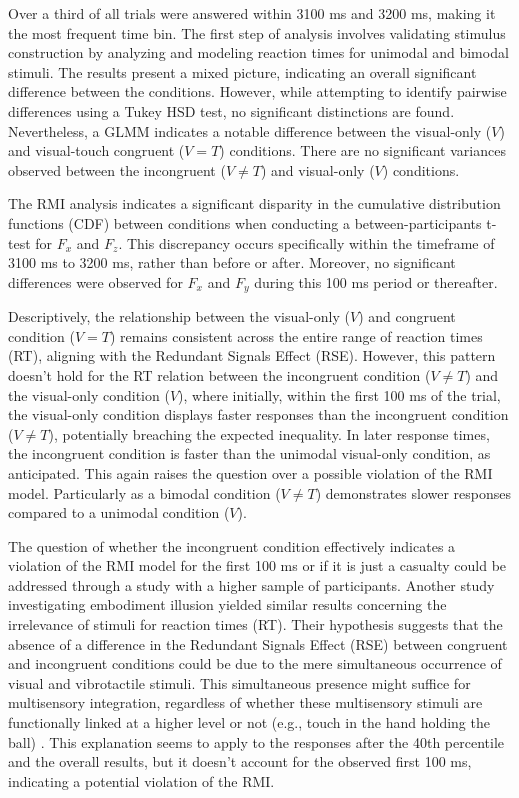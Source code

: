 \documentclass[12pt,oneside,openright]{report}
\begin{document}
Over a third of all trials were answered within 3100 ms and 3200 ms, making it the most frequent time bin. The first step of analysis involves validating stimulus construction by analyzing and modeling reaction times for unimodal and bimodal stimuli. The results present a mixed picture, indicating an overall significant difference between the conditions. However, while attempting to identify pairwise differences using a Tukey HSD test, no significant distinctions are found. Nevertheless, a GLMM indicates a notable difference between the visual-only ($V$) and visual-touch congruent ($V=T$) conditions. There are no significant variances observed between the incongruent ($V \neq T$) and visual-only ($V$) conditions.

The RMI analysis indicates a significant disparity in the cumulative distribution functions (CDF) between conditions when conducting a between-participants t-test for $F_x$ and $F_z$. This discrepancy occurs specifically within the timeframe of 3100 ms to 3200 ms, rather than before or after. Moreover, no significant differences were observed for $F_x$ and $F_y$ during this 100 ms period or thereafter.

Descriptively, the relationship between the visual-only ($V$) and congruent condition ($V=T$) remains consistent across the entire range of reaction times (RT), aligning with the Redundant Signals Effect (RSE). However, this pattern doesn’t hold for the RT relation between the incongruent condition ($V \neq T$) and the visual-only condition ($V$), where initially, within the first 100 ms of the trial, the visual-only condition displays faster responses than the incongruent condition ($V \neq T$), potentially breaching the expected inequality. In later response times, the incongruent condition is faster than the unimodal visual-only condition, as anticipated. This again raises the question over a possible violation of the RMI model. Particularly as a bimodal condition ($V \neq T$) demonstrates slower responses compared to a unimodal condition ($V$).

The question of whether the incongruent condition effectively indicates a violation of the RMI model for the first 100 ms or if it is just a casualty could be addressed through a study with a higher sample of participants. Another study investigating embodiment illusion yielded similar results concerning the irrelevance of stimuli for reaction times (RT). Their hypothesis suggests that the absence of a difference in the Redundant Signals Effect (RSE) between congruent and incongruent conditions could be due to the mere simultaneous occurrence of visual and vibrotactile stimuli. This simultaneous presence might suffice for multisensory integration, regardless of whether these multisensory stimuli are functionally linked at a higher level or not (e.g., touch in the hand holding the ball) \parencite{RSE_FBI}. This explanation seems to apply to the responses after the 40th percentile and the overall results, but it doesn't account for the observed first 100 ms, indicating a potential violation of the RMI.
\end{document}
